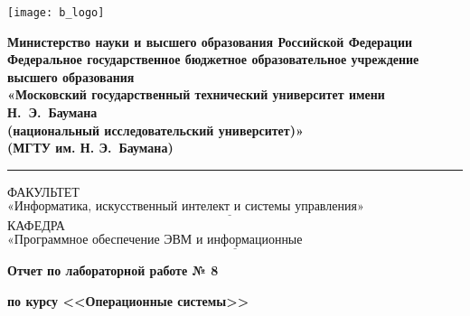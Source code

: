 \begin{titlepage}
	\fontsize{12pt}{12pt}\selectfont
	\noindent \begin{minipage}{0.15\textwidth}
		\texttt{[image: b\_logo]}
	\end{minipage}
	\noindent\begin{minipage}{0.9\textwidth}\centering
		\textbf{Министерство науки и высшего образования Российской Федерации}\\
		\textbf{Федеральное государственное бюджетное образовательное учреждение высшего образования}\\
		\textbf{«Московский государственный технический университет имени Н.~Э.~Баумана}\\
		\textbf{(национальный исследовательский университет)»}\\
		\textbf{(МГТУ им. Н. Э.~Баумана)}
	\end{minipage}

	\noindent\rule{18cm}{3pt}
	\newline\newline
	\noindent ФАКУЛЬТЕТ $\underline{\text{«Информатика, искусственный интелект и системы управления»~~~~~~~~~~~~~~~~~~~~~}}$ \newline\newline
	\noindent КАФЕДРА $\underline{\text{«Программное обеспечение ЭВМ и информационные технологии»~~~~~~~~~~~~~~~~~~~~~~~}}$\newline\newline\newline\newline\newline\newline\newline


	\begin{center}
		\Large\textbf{Отчет по лабораторной работе № 8}
	\end{center}
	\begin{center}
				\Large\textbf{по курсу <<Операционные системы>>}
		
	\end{center}


\end{titlepage}
